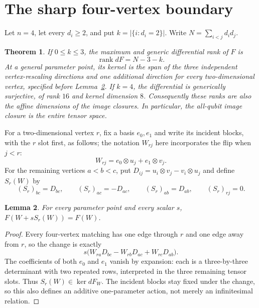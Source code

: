 \documentclass[11pt]{article}
\newtheorem{theorem}{Theorem}[section]
\newtheorem{lemma}[theorem]{Lemma}
\theoremstyle{remark}\newtheorem{remark}[theorem]{Remark}
\DeclareMathOperator{\rank}{rank}
\begin{document}
\section{The sharp four-vertex boundary}
\label{sec:four}
Let $n=4$, let every $d_i\geq2$, and put
$k=|\{i:d_i=2\}|$. Write $N=\sum_{i<j}d_id_j$.

\begin{theorem}\label{thm:sharp-four}
If $0\leq k\leq3$, the maximum and generic differential rank of $F$ is
\[
 \rank dF=N-3-k.
\]
At a general parameter point, its kernel is the span of the three independent
vertex-rescaling directions and one additional direction for every
two-dimensional vertex, specified before Lemma~\ref{lem:root-shear}. If $k=4$, the differential is
generically surjective, of rank $16$ and kernel dimension $8$.
Consequently these ranks are also the affine dimensions of the image
closures. In particular, the all-qubit image closure is the entire tensor
space.
\end{theorem}

For a two-dimensional vertex $r$, fix a basis $e_0,e_1$ and write its
incident blocks, with the $r$ slot first, as follows; the notation
$W_{rj}$ here incorporates the flip when $j<r$:
\[
 W_{rj}=e_0\otimes u_j+e_1\otimes v_j.
\]
For the remaining vertices $a<b<c$, put
$D_{ij}=u_i\otimes v_j-v_i\otimes u_j$ and define $S_r(W)$ by
\[
 (S_r)_{bc}=D_{bc},\qquad
 (S_r)_{ac}=-D_{ac},\qquad
 (S_r)_{ab}=D_{ab},\qquad (S_r)_{rj}=0.
\]

\begin{lemma}\label{lem:root-shear}
For every parameter point and every scalar $s$,
$F(W+sS_r(W))=F(W)$.
\end{lemma}
\begin{proof}
Every four-vertex matching has one edge through $r$ and one edge away
from $r$, so the change is exactly
\[
 s\bigl(W_{ra}D_{bc}-W_{rb}D_{ac}+W_{rc}D_{ab}\bigr).
\]
The coefficients of both $e_0$ and $e_1$ vanish by expansion: each is a
three-by-three determinant with two repeated rows, interpreted in the
three remaining tensor slots. Thus $S_r(W)\in\ker dF_W$. The incident
blocks stay fixed under the change, so this also defines an additive
one-parameter action, not merely an infinitesimal relation.
\end{proof}
\end{document}
